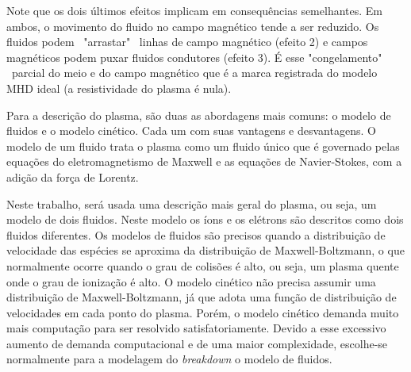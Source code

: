 \documentclass[12pt,oneside,a4paper]{abntex2}
\begin{document}
Note que os dois últimos efeitos implicam em consequências semelhantes.  
Em ambos, o movimento do fluido no campo magnético tende a ser reduzido. 
Os fluidos podem \ "arrastar" \ linhas de campo magnético (efeito 2) e campos magnéticos podem puxar fluidos condutores (efeito 3). 
É esse "congelamento" \ parcial do meio e do campo magnético que é a marca registrada do modelo MHD ideal (a resistividade do plasma é nula).  

Para a descrição do plasma, são duas as abordagens mais comuns: o modelo de fluidos e o modelo cinético. 
Cada um com suas vantagens e desvantagens. %
O modelo de um fluido trata o plasma como um fluido único que é governado pelas equações do eletromagnetismo de Maxwell e as equações de Navier-Stokes, com a adição da força de Lorentz. 

Neste trabalho, será usada uma descrição mais geral do plasma, ou seja, um modelo de dois fluidos. Neste modelo os íons e os elétrons são descritos como dois fluidos diferentes. %
Os modelos de fluidos são precisos quando a distribuição de velocidade das espécies se aproxima da distribuição de Maxwell-Boltzmann, o que normalmente ocorre quando o grau de colisões é alto, ou seja, um plasma quente onde o grau de ionização é alto. 
O modelo cinético não precisa assumir uma distribuição de Maxwell-Boltzmann, já que adota uma função de distribuição de velocidades em cada ponto do plasma. Porém, o modelo cinético demanda muito mais computação para ser resolvido satisfatoriamente. Devido a esse excessivo aumento de demanda computacional e de uma maior complexidade, escolhe-se normalmente para a modelagem do \textit{breakdown} o modelo de fluidos.
\end{document}
